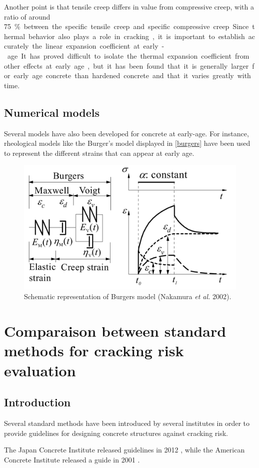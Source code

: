 \documentclass{report}
\begin{document}
Another point is that tensile creep differs in value from compressive creep,
with a ratio of around \SI{75}\percent between the specific tensile creep and
specific compressive creep.

Since thermal behavior also plays a role in cracking, it is important to
establish accurately the linear expansion coefficient at early-age. It has
proved difficult to isolate the thermal expansion coefficient from other
effects at early age, but it has been found that it is generally larger for
early age concrete than hardened concrete and that it varies greatly with time.

\subsection{Numerical models}

Several models have also been developed for concrete at early-age. For
instance, rheological models like the Burger's model displayed in
\autoref{burgers} have been used to represent the different strains that can
appear at early age.

\begin{figure}
  \centering
  \includegraphics[width=.5\linewidth]{burgers}
  \caption{Schematic representation of Burgers model (Nakamura \textit{et al.}
  2002).}\label{burgers}
\end{figure}

\section{Comparaison between standard methods for cracking risk evaluation}
\subsection{Introduction}

Several standard methods have been introduced by several institutes in order to
provide guidelines for designing concrete structures against cracking risk.

The Japan Concrete Institute released guidelines in 2012 \cite{jci}, while the
American Concrete Institute released a guide in 2001 \cite{aci}.
\end{document}

